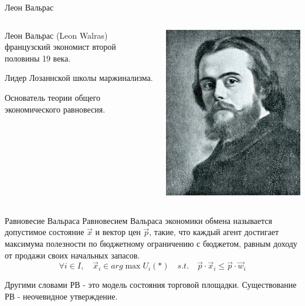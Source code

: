 \documentclass{beamer}
\begin{document}
\begin{frame}{Леон Вальрас}
\begin{columns}
\begin{column}{0.5\textwidth}
   \alert{Леон Вальрас} (Leon Walras) французский экономист второй половины 19 века. 
   
Лидер Лозаннской школы маржинализма. 

Основатель теории общего экономического равновесия.
\end{column}
\begin{column}{0.5\textwidth}  %
    \begin{center}
     \includegraphics[width=1\textwidth]{Walras}
     \end{center}
\end{column}
\end{columns}
\end{frame}

\begin{frame}{Равновесие Вальраса}
\alert{Равновесием Вальраса} экономики обмена называется допустимое состояние $\vec x$ и вектор цен $\vec p$, такие, что каждый агент достигает максимума полезности по бюджетному ограничению с бюджетом, равным доходу от продажи своих начальных запасов.
$$ \forall i \in I, \quad \vec x_i \in arg \max U_i(\ast) \quad s.t. \quad \vec p \cdot \vec x_i \leqslant \vec p \cdot \vec w_i$$

Другими словами РВ - это модель состояния торговой площадки. Существование РВ - неочевидное утверждение.
\end{frame}
\end{document}
